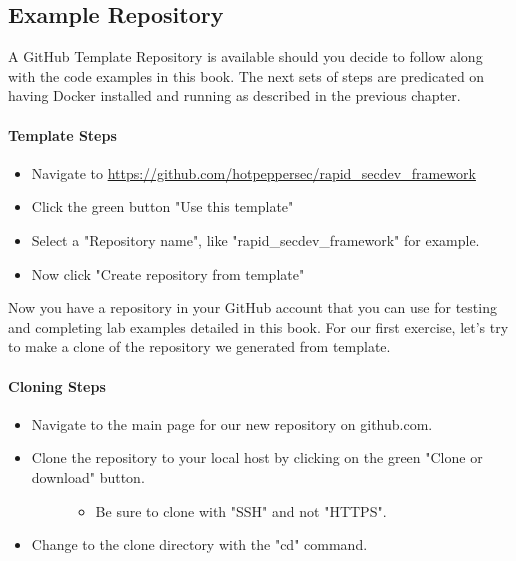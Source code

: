 \subsection{Example Repository}

\justify
A GitHub Template Repository is available should you decide to follow
along with the code examples in this book. The next sets of steps are
predicated on having Docker installed and running as described in the
previous chapter.


\paragraph{Template Steps}

\begin{itemize}

  \item
        Navigate to
        \url{https://github.com/hotpeppersec/rapid_secdev_framework}
  \item
        Click the green button "Use this template"
  \item
        Select a "Repository name", like "rapid\_secdev\_framework" for
        example.
  \item
        Now click "Create repository from template"
\end{itemize}

\justify
Now you have a repository in your GitHub account that you can use for
testing and completing lab examples detailed in this book. For our first
exercise, let's try to make a clone of the repository we generated from
template.


\paragraph{Cloning Steps}

\begin{itemize}
  \item
        Navigate to the main page for our new repository on github.com.
  \item
        \begin{description}
          \item[Clone the repository to your local host by clicking on the green
                "Clone or download" button.]
                \begin{itemize}

                  \item
                        Be sure to clone with "SSH" and not "HTTPS".
                \end{itemize}
        \end{description}
  \item
        Change to the clone directory with the "cd" command.
\end{itemize}

